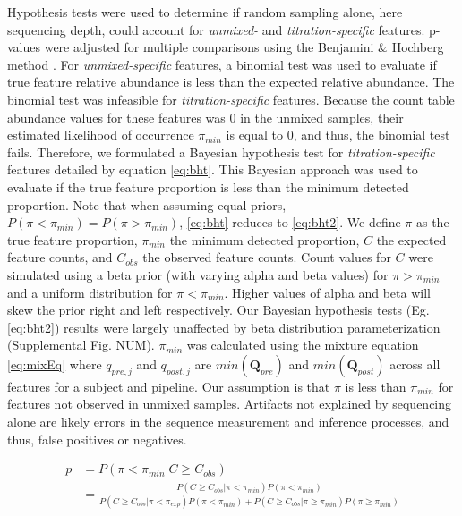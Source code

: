 \documentclass{bmcart}
\begin{document}
Hypothesis tests were used to determine if random sampling alone, here sequencing depth, could account for \emph{unmixed-} and \emph{titration-specific} features.
p-values were adjusted for multiple comparisons using the Benjamini \& Hochberg method \cite{benjamini1995controlling}.
For \emph{unmixed-specific} features, a binomial test was used to evaluate if true feature relative abundance is less than the expected relative abundance.
The binomial test was infeasible for \emph{titration-specific} features.
Because the count table abundance values for these features was 0 in the unmixed samples,
their estimated likelihood of occurrence $\pi_{min}$ is equal to 0,
and thus, the binomial test fails.
Therefore, we formulated a Bayesian hypothesis test for \emph{titration-specific} features detailed by equation \eqref{eq:bht}.
This Bayesian approach was used to  evaluate if the true feature proportion is less than the minimum detected proportion.
Note that when assuming equal priors, $P(\pi < \pi_{min}) = P(\pi > \pi_{min})$,
\eqref{eq:bht} reduces to \eqref{eq:bht2}.
We define $\pi$ as the true feature proportion, $\pi_{min}$ the minimum detected proportion,
$C$ the expected feature counts, and $C_{obs}$ the observed feature counts.
Count values for $C$ were simulated using a beta prior (with varying alpha and beta values) for $\pi > \pi_{min}$ and a uniform distribution for $\pi < \pi_{min}$.
Higher values of alpha and beta will skew the prior right and left respectively. Our Bayesian hypothesis tests (Eg. \eqref{eq:bht2}) results were largely unaffected by beta distribution parameterization (Supplemental Fig. NUM).
$\pi_{min}$ was calculated using the mixture equation \eqref{eq:mixEq} where $q_{pre,j}$ and $q_{post,j}$ are $min(\textbf{Q}_{pre})$ and $min(\textbf{Q}_{post})$ across all features for a subject and pipeline.
Our assumption is that $\pi$ is less than $\pi_{min}$ for features not observed in unmixed samples.
Artifacts not explained by sequencing alone are likely errors in the sequence measurement and inference processes, and thus, false positives or negatives.


\begin{equation}
  \begin{split}
    p & = P(\pi < \pi_{min} | C \geq C_{obs}) \\
      & = \frac{P(C \geq C_{obs}| \pi < \pi_{min})P(\pi < \pi_{min})}{P(C \geq C_{obs}| \pi < \pi_{exp})P(\pi < \pi_{min}) + P(C \geq C_{obs}| \pi \geq \pi_{min})P(\pi \geq \pi_{min})} \\
  \end{split}
  \label{eq:bht}
\end{equation}
\end{document}
